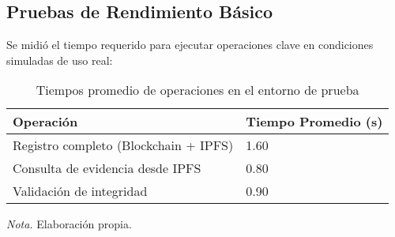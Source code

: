 \subsection{Pruebas de Rendimiento Básico}

Se midió el tiempo requerido para ejecutar operaciones clave en condiciones simuladas de uso real:

\begin{table}[htbp]
    \centering
    \caption{Tiempos promedio de operaciones en el entorno de prueba}
    \begin{tabular}{p{4cm} p{3cm}}
        \toprule
        \textbf{Operación} & \textbf{Tiempo Promedio (s)} \\
        \midrule
        Registro completo (Blockchain + IPFS) & 1.60 \\
        Consulta de evidencia desde IPFS & 0.80 \\
        Validación de integridad & 0.90 \\
        \bottomrule
    \end{tabular}
    \vspace{1em}
    \begin{flushleft}
        \textit{Nota.} Elaboración propia.
    \end{flushleft}
    \label{tab:rendimiento}
\end{table} 